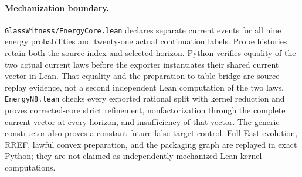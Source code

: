 \documentclass{article}
\begin{document}
\paragraph{Mechanization boundary.}
\texttt{GlassWitness/EnergyCore.lean} declares separate current events for
all nine energy probabilities and twenty-one actual continuation labels.
Probe histories retain both the source index and selected horizon.
Python verifies equality of the two actual current laws before the exporter
instantiates their shared current vector in Lean. That equality and the
preparation-to-table bridge are source-replay evidence, not a second
independent Lean computation of the two laws.
\texttt{EnergyN8.lean} checks every exported rational split with kernel
reduction and proves corrected-core strict refinement, nonfactorization
through the complete current vector at every horizon, and insufficiency
of that vector. The generic constructor also proves a constant-future
false-target control. Full East evolution, RREF, lawful convex preparation,
and the packaging graph are replayed in exact Python; they are not claimed
as independently mechanized Lean kernel computations.
\end{document}
